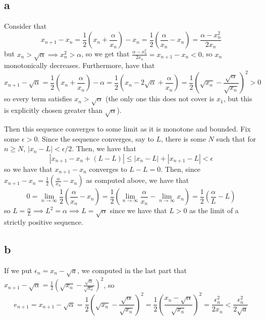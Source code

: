 \documentclass[12pt,letterpaper]{article}
\theoremstyle{definition}
\begin{document}
\subsection*{a}

Consider that
\[
  x_{n+1} - x_{n} = \frac{1}{2}\left(x_{n} + \frac{\alpha}{x_{n}}\right) - x_{n} = \frac{1}{2}\left(\frac{\alpha}{x_{n}} - x_{n}\right) = \frac{\alpha - x_{n}^{2}}{2x_{n}}
\]
but $x_{n} > \sqrt{\alpha} \implies x_{n}^{2} > \alpha$, so we get that $\frac{\alpha - x_{n}^{2}}{2x_{n}} = x_{n+1} - x_{n} < 0$, so $x_{n}$ monotonically decreases. Furthermore, have that
\[
  x_{n+1} - \sqrt{\alpha} = \frac{1}{2}\left(x_{n} + \frac{\alpha}{x_{n}}\right) - \alpha = \frac{1}{2}\left(x_{n} - 2\sqrt{\alpha} + \frac{\alpha}{x_{n}}\right) = \frac{1}{2}\left(\sqrt{x_{n}} - \frac{\sqrt{\alpha}}{\sqrt{x_{n}}}\right)^{2} > 0
\]
so every term satisfies $x_{n} > \sqrt{\alpha}$ (the only one this does not cover is $x_{1}$, but this is explicitly chosen greater than $\sqrt{\alpha}$).

Then this sequence converges to some limit as it is monotone and bounded. Fix some $\epsilon > 0$. Since the sequence converges, say to $L$, there is some $N$ such that for $n \geq N$, $|x_{n} - L| < \epsilon / 2$. Then, we have that
\[
  |x_{n+1} - x_{n} + (L - L)| \leq |x_{n} - L| + |x_{n+1} - L| < \epsilon
\]
so we have that $x_{n+1} - x_{n}$ converges to $L - L = 0$. Then, since $x_{n+1} - x_{n} = \frac{1}{2}\left(\frac{\alpha}{x_{n}} - x_{n}\right)$ as computed above, we have that
\[
  0 = \lim_{n \rightarrow \infty} \frac{1}{2}\left(\frac{\alpha}{x_{n}} - x_{n}\right) = \frac{1}{2}\left(\lim_{n \rightarrow \infty} \frac{\alpha}{x_{n}} - \lim_{n \rightarrow \infty}x_{n}\right) = \frac{1}{2}\left(\frac{\alpha}{L} - L\right)
\]
so $L = \frac{\alpha}{L} \implies L^{2} = \alpha \implies L = \sqrt{\alpha}$ since we have that $L > 0$ as the limit of a strictly positive sequence.

\subsection*{b}

If we put $\epsilon_{n} = x_{n} - \sqrt{a}$, we computed in the last part that $x_{n+1} - \sqrt{\alpha} = \frac{1}{2}\left(\sqrt{x_{n}} - \frac{\sqrt{\alpha}}{\sqrt{x_{n}}}\right)^{2}$, so
\[
  e_{n+1} = x_{n+1} - \sqrt{\alpha} = \frac{1}{2}\left(\sqrt{x_{n}} - \frac{\sqrt{\alpha}}{\sqrt{x_{n}}}\right)^{2} = \frac{1}{2}\left(\frac{x_{n} - \sqrt{\alpha}}{\sqrt{x_{n}}}\right)^{2} = \frac{\epsilon_{n}^{2}}{2x_{n}} < \frac{\epsilon_{n}^{2}}{2\sqrt{a}}
\]
\end{document}

